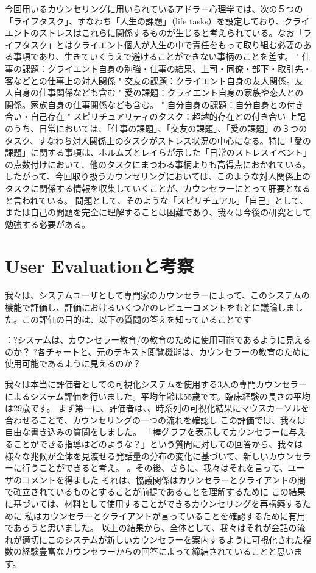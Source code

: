 \documentclass[shuuron]{kuee}
\begin{document}
今回用いるカウンセリングに用いられているアドラー心理学では、次の５つの「ライフタスク」、すなわち「人生の課題」（life tasks）を設定しており、クライエントのストレスはこれらに関係するものが生じると考えられている。なお「ライフタスク」とはクライエント個人が人生の中で責任をもって取り組む必要のある事項であり、生きていくうえで避けることができない事柄のことを差す。
"	仕事の課題：クライエント自身の勉強・仕事の結果、上司・同僚・部下・取引先・客などとの仕事上の対人関係
"	交友の課題：クライエント自身の友人関係。友人自身の仕事関係なども含む
"	愛の課題：クライエント自身の家族や恋人との関係。家族自身の仕事関係なども含む。
"	自分自身の課題：自分自身との付き合い・自己存在
"	スピリチュアリティのタスク：超越的存在との付き合い
上記のうち、日常においては、「仕事の課題」、「交友の課題」、「愛の課題」の３つのタスク、すなわち対人関係上のタスクがストレス状況の中心になる。特に「愛の課題」に関する事項は、ホルムズとレイらが示した「日常のストレスイベント」の点数付けにおいて、他のタスクにまつわる事柄よりも高得点におかれている。したがって、今回取り扱うカウンセリングにおいては、このような対人関係上のタスクに関係する情報を収集していくことが、カウンセラーにとって肝要となると言われている。
問題として、そのような「スピリチュアル」「自己」として、または自己の問題を完全に理解することは困難であり、我々は今後の研究として勉強する必要がある。



\section{User Evaluationと考察}

我々は、システムユーザとして専門家のカウンセラーによって、このシステムの機能で評価し、評価におけるいくつかのレビューコメントをもとに議論しました。この評価の目的は、以下の質問の答えを知っていることです

：?システムは、カウンセラー教育/の教育のために使用可能であるように見えるのか？
?各チャートと、元のテキスト閲覧機能は、カウンセラーの教育のために使用可能であるように見えるのか？

我々は本当に評価者としての可視化システムを使用する3人の専門カウンセラーによるシステム評価を行いました。平均年齢は55歳です。臨床経験の長さの平均は29歳です。
まず第一に、評価者は、、時系列の可視化結果にマウスカーソルを合わせることで、カウンセリングの一つの流れを確認し
  この評価では、我々は自由な書き込みの質問をしました。 「棒グラフを表示してカウンセラーに与えることができる指導はどのような？」という質問に対しての回答から、我々は様々な兆候が全体を見渡せる発話量の分布の変化に基づいて、新しいカウンセラーに行うことができると考え。
  。その後、さらに、我々はそれを言って、ユーザのコメントを得ました
それは、協議関係はカウンセラーとクライアントの間で確立されているものとすることが前提であることを理解するために
この結果に基づいては、材料として使用することができるカウンセリングを再構築するために
私はカウンセラーとクライアントが言っていることを確認するために有用であろうと思いました。
  以上の結果から、全体として、我々はそれが会話の流れが適切にこのシステムが新しいカウンセラーを案内するように可視化された複数の経験豊富なカウンセラーからの回答によって締結されていることと思います。
\end{document}
